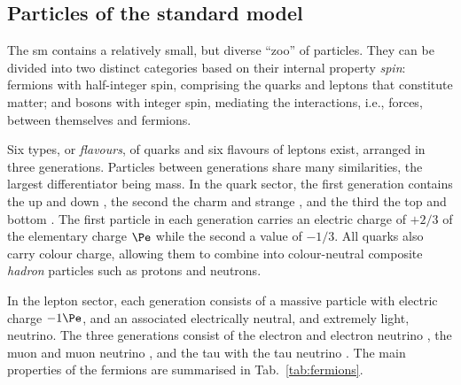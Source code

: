 

\subsection{Particles of the standard model}
\label{subsec:theory_sm_particles}

The \acrlong{sm} contains a relatively small, but diverse ``zoo'' of particles. They can be divided into two distinct categories based on their internal property \emph{spin}: fermions with half-integer spin, comprising the quarks and leptons that constitute matter; and bosons with integer spin, mediating the interactions, i.e., forces, between themselves and fermions.

Six types, or \emph{flavours}, of quarks and six flavours of leptons exist, arranged in three generations. Particles between generations share many similarities, the largest differentiator being mass. In the quark sector, the first generation contains the up \Pup and down \Pdown, the second the charm \Pcharm and strange \Pstrange, and the third the top \Ptop and bottom \Pbottom. The first particle in each generation carries an electric charge of $+\text{2/3}$ of the elementary charge $\Pe$ while the second a value of $-\text{1/3}$. All quarks also carry colour charge, allowing them to combine into colour-neutral composite \emph{hadron} particles such as protons and neutrons.

In the lepton sector, each generation consists of a massive particle with electric charge $-\text{1}\Pe$, and an associated electrically neutral, and extremely light, neutrino. The three generations consist of the electron \Pe and electron neutrino \Pnue, the muon \Pmu and muon neutrino \Pnum, and the tau \Ptau with the tau neutrino \Pnut. The main properties of the fermions are summarised in Tab.~\ref{tab:fermions}.


